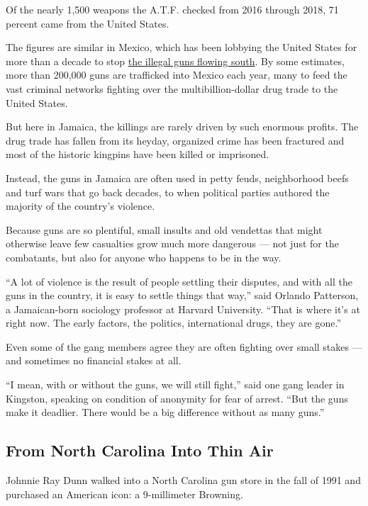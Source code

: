 Of the nearly 1,500 weapons the A.T.F. checked from 2016 through 2018,
71 percent came from the United States.

The figures are similar in Mexico, which has been lobbying the United
States for more than a decade to stop
\href{https://www.nytimes.com/2009/04/15/us/15guns.html}{the illegal
guns flowing south}. By some estimates, more than 200,000 guns are
trafficked into Mexico each year, many to feed the vast criminal
networks fighting over the multibillion-dollar drug trade to the United
States.

But here in Jamaica, the killings are rarely driven by such enormous
profits. The drug trade has fallen from its heyday, organized crime has
been fractured and most of the historic kingpins have been killed or
imprisoned.

Instead, the guns in Jamaica are often used in petty feuds, neighborhood
beefs and turf wars that go back decades, to when political parties
authored the majority of the country's violence.

Because guns are so plentiful, small insults and old vendettas that
might otherwise leave few casualties grow much more dangerous --- not
just for the combatants, but also for anyone who happens to be in the
way.

``A lot of violence is the result of people settling their disputes, and
with all the guns in the country, it is easy to settle things that
way,'' said Orlando Patterson, a Jamaican-born sociology professor at
Harvard University. ``That is where it's at right now. The early
factors, the politics, international drugs, they are gone.''

Even some of the gang members agree they are often fighting over small
stakes --- and sometimes no financial stakes at all.

``I mean, with or without the guns, we will still fight,'' said one gang
leader in Kingston, speaking on condition of anonymity for fear of
arrest. ``But the guns make it deadlier. There would be a big difference
without as many guns.''

\hypertarget{from-north-carolina-into-thin-air}{%
\subsection{From North Carolina Into Thin
Air}\label{from-north-carolina-into-thin-air}}

Johnnie Ray Dunn walked into a North Carolina gun store in the fall of
1991 and purchased an American icon: a 9-millimeter Browning.


